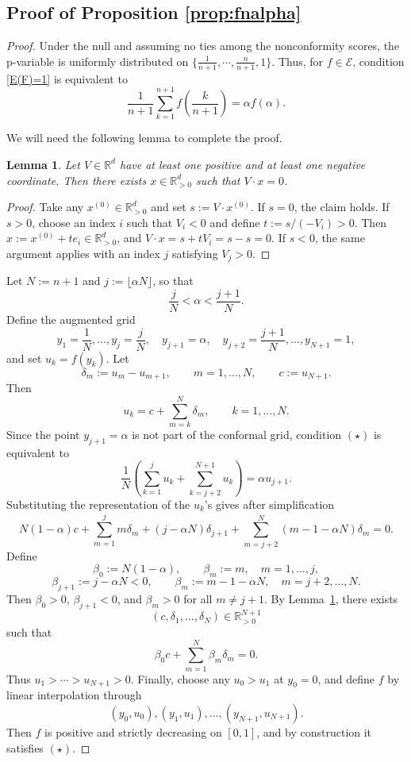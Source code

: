 \documentclass{article}
\theoremstyle{plain}
\newtheorem{lemma}[theorem]{Lemma}
\theoremstyle{definition}
\theoremstyle{remark}
\begin{document}
\subsection{Proof of Proposition \ref{prop:fnalpha}}

 


\begin{proof}
Under the null and assuming no ties among the nonconformity scores, the p-variable is uniformly distributed on $\{\frac{1}{n+1},\cdots, \frac{n}{n+1}, 1\}$. Thus, for $f\in\mathcal{E}$, condition \eqref{E(F)=1} is equivalent to 
\begin{equation}
\label{starprop}
    \frac{1}{n+1}\sum_{k=1}^{n+1}f\left(\frac{k}{n+1}\right) = \alpha f(\alpha).  \tag{$\star$}
\end{equation}

 We will need the following lemma to complete the proof.
\begin{lemma}\label{lem:balance}
Let $V\in\mathbb{R}^d$ have at least one positive and at least one negative coordinate.
Then there exists $x\in\mathbb{R}^d_{>0}$ such that $V\cdot x=0$.
\end{lemma}

\begin{proof}
Take any $x^{(0)}\in\mathbb{R}^d_{>0}$  and set $s:=V\cdot x^{(0)}$.
If $s=0$, the claim holds. If \(s > 0\), choose an index \(i\) such that \(V_i < 0\) and define \(t := s / (-V_i) > 0\). Then \(x := x^{(0)} + t e_i \in \mathbb{R}^d_{>0}\), and $V \cdot x = s + t V_i = s - s = 0$. If \(s < 0\), the same argument applies with an index \(j\) satisfying \(V_j > 0\).
\end{proof}


Let \(N:=n+1\) and \(j:=\lfloor \alpha N\rfloor\), so that
\[
\frac{j}{N}<\alpha<\frac{j+1}{N}.
\]
Define the augmented grid
\[
y_1=\frac1N,\ldots,y_j=\frac jN,\quad
y_{j+1}=\alpha,\quad
y_{j+2}=\frac{j+1}{N},\ldots,y_{N+1}=1,
\]
and set \(u_k=f(y_k)\). Let
\[
\delta_m:=u_m-u_{m+1},\qquad m=1,\ldots,N,
\qquad
c:=u_{N+1}.
\]
Then
\[
u_k=c+\sum_{m=k}^{N}\delta_m,\qquad k=1,\ldots,N.
\]
Since the point \(y_{j+1}=\alpha\) is not part of the conformal grid,
condition \((\star)\) is equivalent to
\[
\frac1N
\left(
\sum_{k=1}^{j}u_k+\sum_{k=j+2}^{N+1}u_k
\right)
=
\alpha u_{j+1}.
\]
Substituting the representation of the \(u_k\)'s gives after simplification
\[
N(1-\alpha)c
+
\sum_{m=1}^{j}m\delta_m
+
(j-\alpha N)\delta_{j+1}
+
\sum_{m=j+2}^{N}(m-1-\alpha N)\delta_m
=
0.
\]
Define
\[
\beta_0:=N(1-\alpha),\qquad
\beta_m:=m,\quad m=1,\ldots,j,
\]
\[
\beta_{j+1}:=j-\alpha N<0,
\qquad
\beta_m:=m-1-\alpha N,\quad m=j+2,\ldots,N.
\]
Then \(\beta_0>0\), \(\beta_{j+1}<0\), and
\(\beta_m>0\) for all \(m\neq j+1\). By Lemma~\ref{lem:balance},
there exists
\[
(c,\delta_1,\ldots,\delta_N)\in\mathbb R_{>0}^{N+1}
\]
such that
\[
\beta_0 c+\sum_{m=1}^{N}\beta_m\delta_m=0.
\]
Thus \(u_1>\cdots>u_{N+1}>0\). Finally, choose any
\(u_0>u_1\) at \(y_0=0\), and define \(f\) by linear interpolation
through
\[
(y_0,u_0),(y_1,u_1),\ldots,(y_{N+1},u_{N+1}).
\]
Then \(f\) is positive and strictly decreasing on \([0,1]\), and by
construction it satisfies \((\star)\).



\end{proof}
\end{document}
